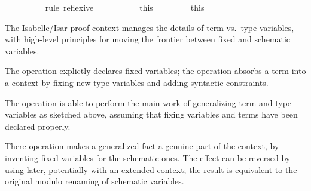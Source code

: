 \begin{isabellebody}
\isanewline
\ \ \ \ \ \ \ \ \isamarkupfalse%
\ {}rule\ reflexive{}\isanewline
\ \ \ \ \isamarkupfalse%
%
\endisatagproof
{\isafoldproof}%
%
\isadelimproof
\isanewline
%
\endisadelimproof
\ \ \ \ \isamarkupfalse%
\ this\ \ %
\isanewline
%
\isadelimproof
\ \ %
\endisadelimproof
%
\isatagproof
{}\isamarkupfalse%
%
\endisatagproof
{\isafoldproof}%
%
\isadelimproof
\isanewline
%
\endisadelimproof
\ \ \isamarkupfalse%
\ this\ \ %
\isanewline
%
\isadelimproof
%
\endisadelimproof
%
\isatagproof
{}\isamarkupfalse%
%
\endisatagproof
{\isafoldproof}%
%
\isadelimproof
%
\endisadelimproof
%
\begin{isamarkuptext}%
The Isabelle/Isar proof context manages the details of term
  vs.\ type variables, with high-level principles for moving the
  frontier between fixed and schematic variables.

  The  operation explictly declares fixed
  variables; the  operation absorbs a term into
  a context by fixing new type variables and adding syntactic
  constraints.

  The  operation is able to perform the main work of
  generalizing term and type variables as sketched above, assuming
  that fixing variables and terms have been declared properly.

  There  operation makes a generalized fact a genuine
  part of the context, by inventing fixed variables for the schematic
  ones.  The effect can be reversed by using  later,
  potentially with an extended context; the result is equivalent to
  the original modulo renaming of schematic variables.


\end{isamarkuptext}
\end{isabellebody}
